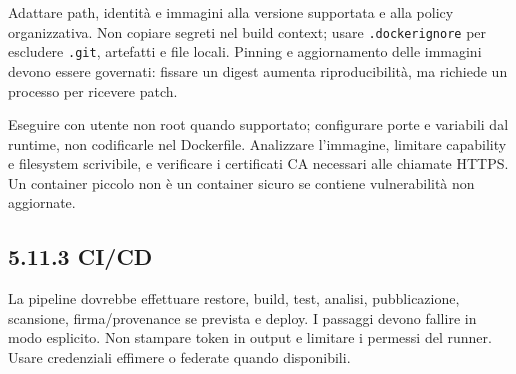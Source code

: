 \documentclass[
  italian,
  10pt,
]{book}
\newenvironment{Shaded}{\begin{snugshade}}{\end{snugshade}}
\newcommand{\AttributeTok}[1]{\textcolor[rgb]{0.13,0.29,0.53}{#1}}
\newcommand{\DataTypeTok}[1]{\textcolor[rgb]{0.13,0.29,0.53}{#1}}
\newcommand{\ExtensionTok}[1]{#1}
\newcommand{\KeywordTok}[1]{\textcolor[rgb]{0.13,0.29,0.53}{\textbf{#1}}}
\newcommand{\NormalTok}[1]{#1}
\newcommand{\OperatorTok}[1]{\textcolor[rgb]{0.81,0.36,0.00}{\textbf{#1}}}
\newcommand{\StringTok}[1]{\textcolor[rgb]{0.31,0.60,0.02}{#1}}
\begin{document}
\begin{Shaded}
\end{Shaded}

Adattare path, identità e immagini alla versione supportata e alla
policy organizzativa. Non copiare segreti nel build context; usare
\texttt{.dockerignore} per escludere \texttt{.git}, artefatti e file
locali. Pinning e aggiornamento delle immagini devono essere governati:
fissare un digest aumenta riproducibilità, ma richiede un processo per
ricevere patch.

Eseguire con utente non root quando supportato; configurare porte e
variabili dal runtime, non codificarle nel Dockerfile. Analizzare
l'immagine, limitare capability e filesystem scrivibile, e verificare i
certificati CA necessari alle chiamate HTTPS. Un container piccolo non è
un container sicuro se contiene vulnerabilità non aggiornate.

\subsection{5.11.3 CI/CD}\label{cicd}

La pipeline dovrebbe effettuare restore, build, test, analisi,
pubblicazione, scansione, firma/provenance se prevista e deploy. I
passaggi devono fallire in modo esplicito. Non stampare token in output
e limitare i permessi del runner. Usare credenziali effimere o federate
quando disponibili.
\end{document}
